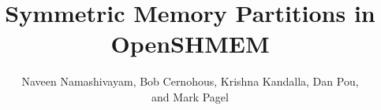 \documentclass[runningheads,a4paper]{llncs}
\begin{document}
\mainmatter
\title{Symmetric Memory Partitions in OpenSHMEM}
\author{Naveen Namashivayam, Bob Cernohous, Krishna Kandalla, Dan Pou,\\
and Mark Pagel}


\maketitle
\begin{abstract}

\end{abstract}














\end{document}
